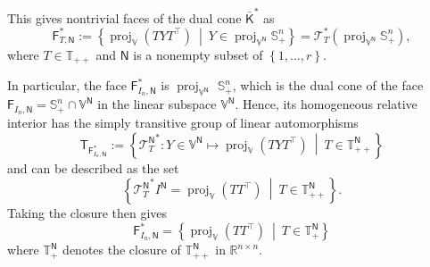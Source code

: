 \documentclass[oneside]{amsart}
\theoremstyle{plain}
\theoremstyle{definition}
\theoremstyle{remark}
\numberwithin{equation}{section}
\DeclareMathOperator{\proj}{proj}
\begin{document}
This gives nontrivial faces of the dual cone $\bar{\mathsf{K}}^{*}$ as
\[
\mathsf{F}^{*}_{T,\mathsf{N}} := \left\{\proj_{\mathbb{V}}\left( T Y
T^{\top} \right)\ \middle|\ Y \in \proj_{\mathbb{V}^{\mathsf{N}}}
\mathbb{S}^{n}_{+}\right\} = \mathcal{T}^{*}_{T} \left(
\proj_{\mathbb{V}^{\mathsf{N}}} \mathbb{S}^{n}_{+} \right),
\]
where $T \in \mathbb{T}_{++}$ and $\mathsf{N}$ is a nonempty subset of
$\left\{1, \dotsc, r\right\}$.

In particular, the face $\mathsf{F}^{*}_{I_{n},\mathsf{N}}$ is
$\proj_{\mathbb{V}^{\mathsf{N}}}$ $\mathbb{S}^{n}_{+}$, which is the dual
cone of the face $\mathsf{F}_{I_{n},\mathsf{N}} = \mathbb{S}^{n}_{+} \cap
\mathbb{V}^{\mathsf{N}}$ in the linear subspace $\mathbb{V}^{\mathsf{N}}$.
Hence, its homogeneous relative interior has the simply transitive group of
linear automorphisms
\[
\mathsf{T}_{\mathsf{F}^{*}_{I_{n},\mathsf{N}}} :=
\left\{{\mathcal{T}_{T}^{\mathsf{N}}}^{*} : Y \in \mathbb{V}^{\mathsf{N}}
\mapsto \proj_{\mathbb{V}}\left( T Y T^{\top} \right)\ \middle|\ T \in
\mathbb{T}_{++}^{\mathsf{N}}\right\}
\]
and can be described as the set
\[
\left\{{\mathcal{T}_{T}^{\mathsf{N}}}^{*} I^{\mathsf{N}} =
\proj_{\mathbb{V}}\left( T T^{\top} \right)\ \middle|\ T \in
\mathbb{T}_{++}^{\mathsf{N}}\right\}.
\]
Taking the closure then gives
\[
\mathsf{F}^{*}_{I_{n},\mathsf{N}} = \left\{\proj_{\mathbb{V}}\left( T
T^{\top} \right)\ \middle|\ T \in \mathbb{T}_{+}^{\mathsf{N}}\right\}
\]
where $\mathbb{T}_{+}^{\mathsf{N}}$ denotes the closure of
$\mathbb{T}_{++}^{\mathsf{N}}$ in $\mathbb{R}^{n \times n}$.
\end{document}
